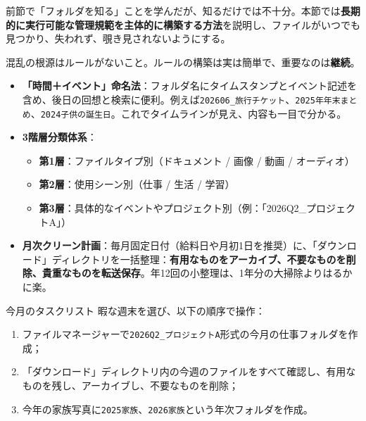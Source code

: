 
前節で「フォルダを知る」ことを学んだが、知るだけでは不十分。本節では\textbf{長期的に実行可能な管理規範を主体的に構築する方法}を説明し、ファイルがいつでも見つかり、失われず、覗き見されないようにする。


混乱の根源はルールがないこと。ルールの構築は実は簡単で、重要なのは\textbf{継続}。

\begin{itemize}
  \item \textbf{「時間＋イベント」命名法}：フォルダ名にタイムスタンプとイベント記述を含め、後日の回想と検索に便利。例えば\texttt{202606\_旅行チケット}、\texttt{2025年年末まとめ}、\texttt{2024子供の誕生日}。これでタイムラインが見え、内容も一目で分かる。
  \item \textbf{3階層分類体系}：
  \begin{itemize}
    \item \textbf{第1層}：ファイルタイプ別（ドキュメント / 画像 / 動画 / オーディオ）
    \item \textbf{第2層}：使用シーン別（仕事 / 生活 / 学習）
    \item \textbf{第3層}：具体的なイベントやプロジェクト別（例：「2026Q2\_プロジェクトA」）
  \end{itemize}
  \item \textbf{月次クリーン計画}：毎月固定日付（給料日や月初1日を推奨）に、「ダウンロード」ディレクトリを一括整理：\textbf{有用なものをアーカイブ、不要なものを削除、貴重なものを転送保存}。年12回の小整理は、1年分の大掃除よりはるかに楽。
\end{itemize}

\begin{tcbpractice}{今月のタスクリスト}
暇な週末を選び、以下の順序で操作：

\begin{enumerate}
  \item ファイルマネージャーで\texttt{2026Q2\_プロジェクトA}形式の今月の仕事フォルダを作成；
  \item 「ダウンロード」ディレクトリ内の今週のファイルをすべて確認し、有用なものを残し、アーカイブし、不要なものを削除；
  \item 今年の家族写真に\texttt{2025家族}、\texttt{2026家族}という年次フォルダを作成。
\end{enumerate}

\end{tcbpractice}


